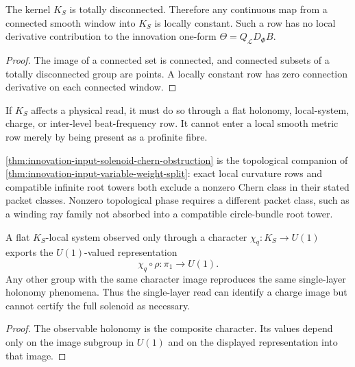 \begin{theorem}
\label{thm:innovation-input-solenoid-profinite-smooth-obstruction}
The kernel $K_S$ is totally disconnected. Therefore any continuous map from
a connected smooth window into $K_S$ is locally constant. Such a row has no
local derivative contribution to the innovation one-form
$\Theta=Q_{\mathcal L}D_\Phi B$.
\end{theorem}

\begin{proof}
The image of a connected set is connected, and connected subsets of a
totally disconnected group are points. A locally constant row has zero
connection derivative on each connected window.
\end{proof}

\begin{principle}
\label{prin:innovation-input-solenoid-flat-holonomy-channel}
If $K_S$ affects a physical read, it must do so through a flat holonomy,
local-system, charge, or inter-level beat-frequency row. It cannot enter a
local smooth metric row merely by being present as a profinite fibre.
\end{principle}

\begin{principle}
\label{prin:innovation-input-solenoid-flat-topological-charge}
\autoref{thm:innovation-input-solenoid-chern-obstruction} is the
topological companion of
\autoref{thm:innovation-input-variable-weight-split}: exact local curvature
rows and compatible infinite root towers both exclude a nonzero Chern class
in their stated packet classes. Nonzero topological phase requires a
different packet class, such as a winding ray family not absorbed into a
compatible circle-bundle root tower.
\end{principle}

\begin{theorem}
\label{thm:innovation-input-solenoid-single-layer-absorption}
A flat $K_S$-local system observed only through a character
$\chi_q:K_S\to U(1)$ exports the $U(1)$-valued representation
$$
\chi_q\circ\rho:\pi_1\to U(1).
$$
Any other group with the same character image reproduces the same
single-layer holonomy phenomena. Thus the single-layer read can identify a
charge image but cannot certify the full solenoid as necessary.
\end{theorem}

\begin{proof}
The observable holonomy is the composite character. Its values depend only
on the image subgroup in $U(1)$ and on the displayed representation into
that image.
\end{proof}

